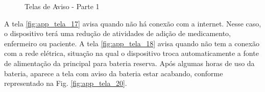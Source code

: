 \begin{apendicesenv}
\begin{figure}[H]
    \centering
    \caption{Telas de Aviso - Parte 1 }\label{fig:telas_14_15_16}
\end{figure}

A tela \ref{fig:app_tela_17} avisa quando não há conexão com a internet. Nesse caso, o dispositivo terá uma redução de atividades de adição de medicamento, enfermeiro ou paciente. A tela \ref{fig:app_tela_18} avisa quando não tem a conexão com a rede elétrica, situação na qual o dispositivo troca automaticamente a fonte de alimentação da principal para bateria reserva. Após algumas horas de uso da bateria, aparece a tela com aviso  da bateria estar acabando, conforme representado na Fig. \ref{fig:app_tela_20}.


\end{apendicesenv}
